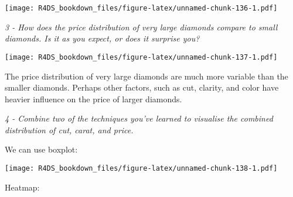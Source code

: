 \documentclass[]{article}
\newenvironment{Shaded}{\begin{snugshade}}{\end{snugshade}}
\newcommand{\KeywordTok}[1]{\textcolor[rgb]{0.13,0.29,0.53}{\textbf{#1}}}
\newcommand{\DataTypeTok}[1]{\textcolor[rgb]{0.13,0.29,0.53}{#1}}
\newcommand{\DecValTok}[1]{\textcolor[rgb]{0.00,0.00,0.81}{#1}}
\newcommand{\StringTok}[1]{\textcolor[rgb]{0.31,0.60,0.02}{#1}}
\newcommand{\OperatorTok}[1]{\textcolor[rgb]{0.81,0.36,0.00}{\textbf{#1}}}
\newcommand{\NormalTok}[1]{#1}
\theoremstyle{definition}
\theoremstyle{definition}
\theoremstyle{definition}
\theoremstyle{remark}
\begin{document}
\texttt{[image: R4DS\_bookdown\_files/figure-latex/unnamed-chunk-136-1.pdf]}

\emph{3 - How does the price distribution of very large diamonds compare
to small diamonds. Is it as you expect, or does it surprise you?}

\begin{Shaded}
\end{Shaded}

\texttt{[image: R4DS\_bookdown\_files/figure-latex/unnamed-chunk-137-1.pdf]}

The price distribution of very large diamonds are much more variable
than the smaller diamonds. Perhaps other factors, such as cut, clarity,
and color have heavier influence on the price of larger diamonds.

\emph{4 - Combine two of the techniques you've learned to visualise the
combined distribution of cut, carat, and price.}

We can use boxplot:

\begin{Shaded}
\end{Shaded}

\texttt{[image: R4DS\_bookdown\_files/figure-latex/unnamed-chunk-138-1.pdf]}

Heatmap:
\end{document}
